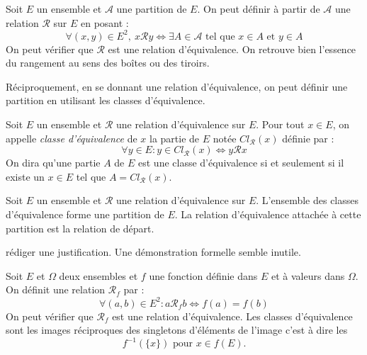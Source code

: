 \begin{exple}
 Soit $E$ un ensemble et $\mathcal{A}$ une partition de $E$. On peut définir à partir de $\mathcal A$ une relation $\mathcal{R}$ sur $E$ en posant :
\begin{displaymath}
 \forall (x,y)\in E^2 ,\:
x\mathcal R y \Leftrightarrow \exists A \in \mathcal A \text{ tel que } x\in A \text{ et } y\in A
\end{displaymath}
On peut vérifier que $\mathcal R$ est une relation d'équivalence. On retrouve bien l'essence du rangement au sens des boîtes ou des tiroirs.
\end{exple}
Réciproquement, en se donnant une relation d'équivalence, on peut définir une partition en utilisant les classes d'équivalence.
\begin{defi}
 Soit $E$ un ensemble et $\mathcal R$ une relation d'équivalence sur $E$. Pour tout $x\in E$, on appelle \emph{classe d'équivalence} de $x$ la partie de $E$ notée $Cl_\mathcal{R}(x)$ définie par :
\begin{displaymath}
 \forall y\in E: y\in Cl_\mathcal{R}(x) \Leftrightarrow y \mathcal R x
\end{displaymath}
On dira qu'une partie $A$ de $E$ est une classe d'équivalence si et seulement si il existe un $x\in E$ tel que $A=Cl_\mathcal{R}(x)$.
\end{defi}
\begin{prop}
 Soit $E$ un ensemble et $\mathcal R$ une relation d'équivalence sur $E$. L'ensemble des classes d'équivalence forme une partition de $E$. La relation d'équivalence attachée à cette partition est la relation de départ.
\end{prop}
\begin{demo}
 rédiger une justification. Une démonstration formelle semble inutile.
\end{demo}


\begin{exple}
 Soit $E$ et $\Omega$ deux ensembles et $f$ une fonction définie dans $E$ et à valeurs dans $\Omega$. On définit une relation $\mathcal R_f$ par : 
\begin{displaymath}
 \forall (a,b)\in E^2 : a\mathcal R_f b \Leftrightarrow f(a)=f(b)
\end{displaymath}
On peut vérifier que $\mathcal R_f$ est une relation  d'équivalence. Les classes d'équivalence sont les images réciproques des singletons d'éléments de l'image c'est à dire les
\begin{displaymath}
 f^{-1}(\{x\})\text{ pour } x\in f(E).
\end{displaymath}
\end{exple}

